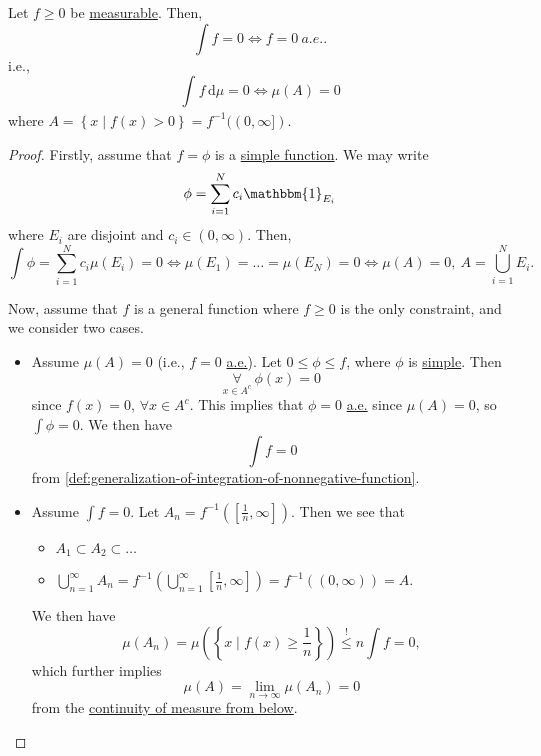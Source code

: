 \begin{proposition}\label{prop:lec12-1}
	Let \(f\geq 0\) be \hyperref[def:measurable-function]{measurable}. Then,
	\[
		\int f = 0 \iff f = 0\ \hyperref[def:mu-almost-everywhere]{a.e.}.
	\]
	i.e.,
	\[
		\int_{}^{} f \,\mathrm{d}\mu = 0 \iff \mu (A) = 0
	\]
	where \(A = \left\{x \mid f(x)>0\right\} = f^{-1} ((0, \infty ])\).
\end{proposition}
\begin{proof}
	Firstly, assume that \(f = \phi \) is a \hyperref[def:simple-function]{simple function}. We may write
	\[
		\phi = \sum\limits_{i=1}^{N} c_{i}\mathbbm{1}_{E_{i}}
	\]
	where \(E_{i}\) are disjoint and \(c_{i}\in(0, \infty )\). Then,
	\[
		\int \phi = \sum\limits_{i=1}^{N} c_{i}\mu (E_{i}) = 0
		\iff \mu (E_1) = \dots = \mu (E_{N}) = 0
		\iff \mu (A) = 0,\ A = \bigcup\limits_{i=1}^{N} E_{i}.
	\]

	Now, assume that \(f\) is a general function where \(f\geq 0\) is the only constraint, and we consider two cases.
	\begin{itemize}
		\item Assume \(\mu (A) = 0\) (i.e., \(f = 0\) \hyperref[def:mu-almost-everywhere]{a.e.}). Let \(0\leq \phi \leq f\), where \(\phi\) is \hyperref[def:simple-function]{simple}. Then
		      \[
			      \underset{x\in A^{c} }{\forall }\ \phi (x) = 0
		      \]
		      since \(f(x) = 0\), \(\forall x\in A^{c} \). This implies that \(\phi = 0\) \hyperref[def:mu-almost-everywhere]{a.e.} since \(\mu (A) = 0\), so \(\int \phi =0\). We then have
		      \[
			      \int f = 0
		      \]
		      from \autoref{def:generalization-of-integration-of-nonnegative-function}.
		\item Assume \(\int f = 0\). Let \(A_{n} = f^{-1} \left(\left[\frac{1}{n}, \infty \right]\right)\). Then we see that
		      \begin{itemize}
			      \item \(A_1\subset A_2\subset \dots  \)
			      \item \(\bigcup\limits_{n=1}^{\infty} A_{n} = f^{-1} \left(\bigcup\limits_{n=1}^{\infty} \left[\frac{1}{n}, \infty \right]\right) = f^{-1} ((0, \infty )) = A\).
		      \end{itemize}
		      We then have
		      \[
			      \mu (A_{n}) = \mu \left(\left\{x \mid f(x)\geq \frac{1}{n}\right\}\right) \overset{\hyperref[lma:Markov-inequality]{!}}{\leq }n \int f = 0,
		      \]
		      which further implies
		      \[
			      \mu (A) = \lim\limits_{n \to \infty} \mu (A_{n}) = 0
		      \]
		      from the \hyperref[thm:measure-space-continuity-from-below]{continuity of measure from below}.
	\end{itemize}
\end{proof}

